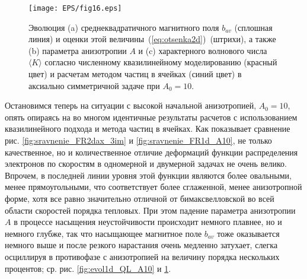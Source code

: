 \begin{figure}[b]
\centering
\texttt{[image: EPS/fig16.eps]}
\caption{Эволюция (a) среднеквадратичного магнитного поля $b_{av}$ (сплошная линия) и оценки этой величины~(\ref{eq:otsenka2d})~(штрихи), а также (b) параметра анизотропии $A$ и (c) характерного волнового числа $\langle K\rangle$ согласно численному квазилинейному моделированию (красный цвет) и расчетам методом частиц в ячейках (синий цвет) в аксиально симметричной задаче при $A_0=10$.}
\label{fig:evol2d}
\end{figure}
Остановимся теперь на ситуации с высокой начальной анизотропией, $A_0=10$, опять опираясь на во многом идентичные результаты расчетов с использованием квазилинейного подхода и метода частиц в ячейках. Как показывает сравнение рис. \ref{fig:sravnenie_FR2dax_3im} и \ref{fig:sravnenie_FR1d_A10}, не только качественное, но и количественное отличие деформаций функции распределения электронов по скоростям в одномерной и двумерной задачах не очень велико. Впрочем, в последней линии уровня этой функции являются более овальными, менее прямоугольными, что соответствует более сглаженной, менее анизотропной форме, хотя все равно значительно отличной от бимаксвелловской во всей области скоростей порядка тепловых. При этом падение параметра анизотропии $A$ в процессе насыщения неустойчивости происходит немного плавнее, но и немного глубже, так что насыщающее магнитное поле $b_{av}$ тоже оказывается немного выше и после резкого нарастания очень медленно затухает, слегка осциллируя в противофазе с анизотропией на величину порядка нескольких процентов; ср. рис. \ref{fig:evol1d_QL_A10} и \ref{fig:evol2d}. 

